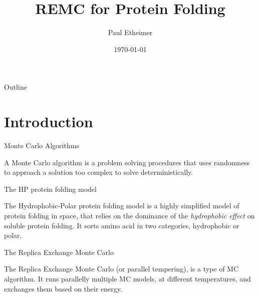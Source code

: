 \documentclass[presentation]{beamer}
\author{Paul Etheimer}
\date{\today}
\title{REMC for Protein Folding}
\begin{document}
\maketitle
\begin{frame}{Outline}
\tableofcontents
\end{frame}

\section{Introduction}
\label{sec:org47d9eab}
\begin{frame}[label={sec:org92d9e4b}]{Monte Carlo Algorithms}
\begin{definition}[MC algorithm]
A Monte Carlo algorithm is a problem solving procedures that uses randomness to approach a solution too complex to solve deterministically.
\end{definition}
\end{frame}
\begin{frame}[label={sec:org6927040}]{The HP protein folding model}
\begin{definition}[HP model]
The Hydrophobic-Polar protein folding model is a highly simplified model of protein folding in space, that relies on the dominance of the \emph{hydrophobic effect} on soluble protein folding. It sorts amino acid in two categories, hydrophobic or polar.
\end{definition}
\end{frame}
\begin{frame}[label={sec:orgddbb716}]{The Replica Exchange Monte Carlo}
\begin{definition}[REMC]
The Replica Exchange Monte Carlo (or parallel tempering), is a type of MC algorithm. It runs parallelly multiple MC models, at different temperatures, and exchanges them based on their energy.
\end{definition}
\end{frame}
\end{document}
